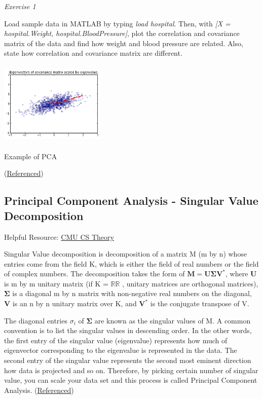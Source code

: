 \documentclass{tufte-handout}
\begin{document}
\textit{Exercise 1}

Load sample data in MATLAB by typing \textit{load hospital}. Then, with \textit{[X = hospital.Weight, hospital.BloodPressure]}, plot the correlation and covariance matrix of the data and find how weight and blood pressure are related. Also, state how correlation and covariance matrix are different.

\begin{marginfigure}
    \centering
    \includegraphics[width = 5cm, height = 4cm]{PCA.png}
    \label{fig:PCA}
\caption{Example of PCA}
(\href{https://people.duke.edu/~ccc14/sta-663/PCASolutions.html}{Referenced})

\end{marginfigure}

\subsection{Principal Component Analysis - Singular Value Decomposition}
Helpful Resource: 
\href{https://www.cs.cmu.edu/~venkatg/teaching/CStheory-infoage/book-chapter-4.pdf}{CMU CS Theory}

Singular Value decomposition is decomposition of a matrix M (m by n) whose entries come from the field K, which is either the field of real numbers or the field of complex numbers. The decomposition takes the form of ${\displaystyle \mathbf {M} =\mathbf {U} {\boldsymbol {\Sigma }}\mathbf {V} ^{*}}$, where $\mathbf{U}$ is m by m unitary matrix (if  K = ${\displaystyle \mathbb {R} } \mathbb {R}$ , unitary matrices are orthogonal matrices), $\boldsymbol{{\Sigma}}$ is a diagonal m by n matrix with non-negative real numbers on the diagonal, $\mathbf{V}$ is an n by n unitary matrix over K, and
$\mathbf{{V}^{*}}$ is the conjugate transpose of V.

The diagonal entries ${\sigma_{i}}$ of $\mathbf{\Sigma}$ are known as the singular values of M. A common convention is to list the singular values in descending order. In the other words, the first entry of the singular value (eigenvalue) represents how much of eigenvector corresponding to the eigenvalue is represented in the data. The second entry of the singular value represents the second most eminent direction how data is projected and so on. Therefore, by picking certain number of singular value, you can scale your data set and this process is called Principal Component Analysis. (\href{https://en.wikipedia.org/wiki/Singular-value_decomposition}{Referenced})
\end{document}
